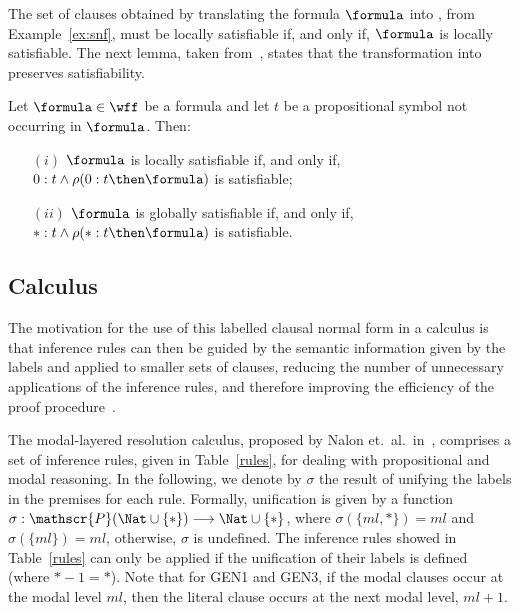 The set of clauses obtained by translating the formula $\formula$ into
, from Example~\ref{ex:snf}, must be locally satisfiable if, and only
if, $\formula$ is locally satisfiable. The next lemma, taken
from~\cite{nalon2015modal}, states that the transformation into 
preserves satisfiability.

\begin{lemma}
    Let $\formula \in \wff$ be a formula and let $t$ be a propositional symbol
    not occurring in $\formula$. Then: 
    \begin{enumerate}
        \item[$(i)$] $\formula$ is locally satisfiable if, and only if, $0 : t \land \rho(0 : t \then \formula)$ is satisfiable;
        \item[$(ii)$] $\formula$ is globally satisfiable if, and only if, $* : t \land \rho(* : t \then \formula)$ is satisfiable.
    \end{enumerate}
\end{lemma}

\subsection{Calculus}

The motivation for the use of this labelled clausal normal form in a calculus is
that inference rules can then be guided by the semantic information given by the
labels and applied to smaller sets of clauses, reducing the number of
unnecessary applications of the inference rules, and therefore improving the efficiency of the proof
procedure~\cite{Nalon2016}. 

The modal-layered resolution calculus, proposed by Nalon et.\ al.\
in~\cite{nalon2015modal}, comprises a set of inference rules, given in
Table~\ref{rules}, for dealing with propositional and modal reasoning. In the
following, we denote by $\sigma$ the result of unifying the labels in the
premises for each rule.  Formally, unification is given by a function $ \sigma :
\mathscr{P}(\Nat \cup \{*\}) \longrightarrow \Nat \cup \{*\}$, where $\sigma
(\{ml, *\}) = ml$ and $\sigma (\{ml\}) = ml$, otherwise, $\sigma$ is undefined.
The inference rules showed in Table~\ref{rules} can only be applied if the
unification of their labels is defined (where $* - 1 = *$). Note that for GEN1
and GEN3, if the modal clauses occur at the modal level $ml$, then the literal
clause occurs at the next modal level, $ml + 1$.

